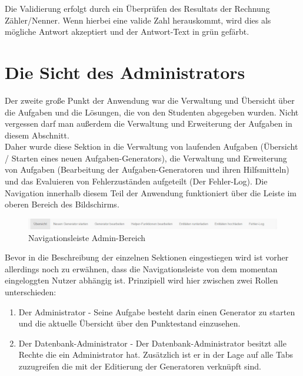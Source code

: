 Die Validierung erfolgt durch ein Überprüfen des Resultats der Rechnung Zähler/Nenner. Wenn hierbei eine valide Zahl herauskommt, wird dies als mögliche Antwort akzeptiert und der Antwort-Text in grün gefärbt.


\section{Die Sicht des Administrators}

Der zweite große Punkt der Anwendung war die Verwaltung und Übersicht über die Aufgaben und die Lösungen, die von den Studenten abgegeben wurden. Nicht vergessen darf man außerdem die Verwaltung und Erweiterung der Aufgaben in diesem Abschnitt. \\

Daher wurde diese Sektion in die Verwaltung von laufenden Aufgaben (Übersicht / Starten eines neuen Aufgaben-Generators), die Verwaltung und Erweiterung von Aufgaben (Bearbeitung der Aufgaben-Generatoren und ihren Hilfsmitteln) und das Evaluieren von Fehlerzuständen aufgeteilt (Der Fehler-Log). Die Navigation innerhalb diesem Teil der Anwendung funktioniert über die Leiste im oberen Bereich des Bildschirms. \\
\begin{figure}[htp]     %
\centering
\includegraphics[width=1\textwidth]{bilder/NavBar} 
\caption[Navigationsleiste Admin-Bereich]{Navigationsleiste Admin-Bereich}
\end{figure} 

Bevor in die Beschreibung der einzelnen Sektionen eingestiegen wird ist vorher allerdings noch zu erwähnen, dass die Navigationsleiste von dem momentan eingeloggten Nutzer abhängig ist. Prinzipiell wird hier zwischen zwei Rollen unterschieden:

\begin{enumerate}
\itemsep0em
\item Der Administrator - Seine Aufgabe besteht darin einen Generator zu starten und die aktuelle Übersicht über den Punktestand einzusehen.
\item Der Datenbank-Administrator - Der Datenbank-Administrator besitzt alle Rechte die ein Administrator hat. Zusätzlich ist er in der Lage auf alle Tabs zuzugreifen die mit der Editierung der Generatoren verknüpft sind.
\end{enumerate}

